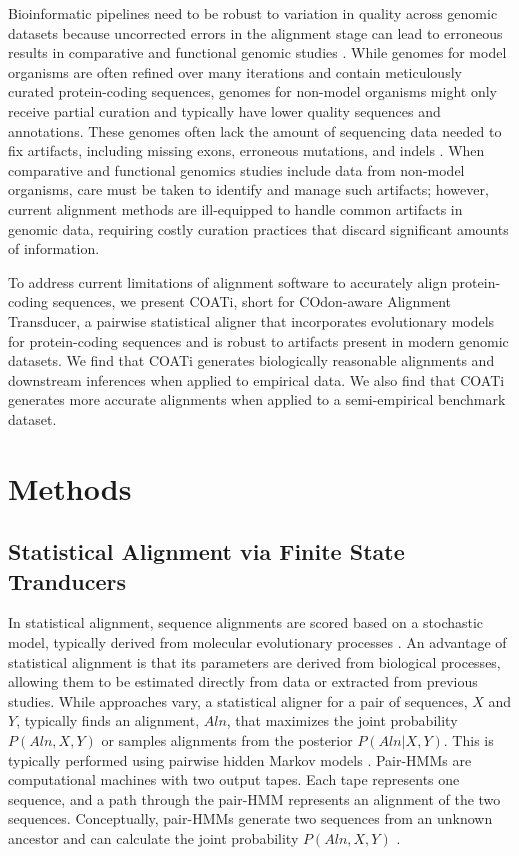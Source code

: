 \documentclass[12pt,letterpaper]{article}
\begin{document}
Bioinformatic pipelines need to be robust to variation in quality across genomic datasets because uncorrected errors in the alignment stage can lead to erroneous results in comparative and functional genomic studies \citep{estimates_schneider_2009, effect_fletcher_2010, hubisz2011error}.
While genomes for model organisms are often refined over many iterations and contain meticulously curated protein-coding sequences, 
genomes for non-model organisms might only receive partial curation and typically have lower quality sequences and annotations.
These genomes often lack the amount of sequencing data needed to fix artifacts, including missing exons, erroneous mutations, and indels \citep{jackman2018tigmint}.
%
When comparative and functional genomics studies include data from non-model organisms, care must be taken to identify and manage such artifacts; however,
current alignment methods are ill-equipped to handle common artifacts in genomic data, requiring costly curation practices that discard significant amounts of information.

To address current limitations of alignment software to accurately align protein-coding sequences, we present COATi, short for COdon-aware Alignment Transducer, a pairwise statistical aligner that incorporates evolutionary models for protein-coding sequences and is robust to artifacts present in modern genomic datasets. We find that COATi generates biologically reasonable alignments and downstream inferences when applied to empirical data. We also find that COATi generates more accurate alignments when applied to a semi-empirical benchmark dataset.

\section*{Methods}

\subsection*{Statistical Alignment via Finite State Tranducers}

In statistical alignment, sequence alignments are scored based on a stochastic model, typically derived from molecular evolutionary processes \citep{hein2001algorithm,holmes2001evolutionary,Lunter2005-hk,Holmes2020,demaio2021cumulative}. An advantage of statistical alignment is that its parameters are derived from biological processes, allowing them to be estimated directly from data or extracted from previous studies. While approaches vary, a statistical aligner for a pair of sequences, $X$ and $Y$, typically finds an alignment, $Aln$, that maximizes the joint probability $P(Aln, X, Y)$ or samples alignments from the posterior $P(Aln | X, Y)$. This is typically performed using pairwise hidden Markov models \citep[pair-HMMs;][]{holmes2001evolutionary,redelings2007incorporating,problems_cartwright_2009}. Pair-HMMs are computational machines with two output tapes. Each tape represents one sequence, and a path through the pair-HMM represents an alignment of the two sequences. Conceptually, pair-HMMs generate two sequences from an unknown ancestor and can calculate the joint probability $P(Aln, X, Y)$ \citep{yoon_2009_hmm}.
\end{document}
